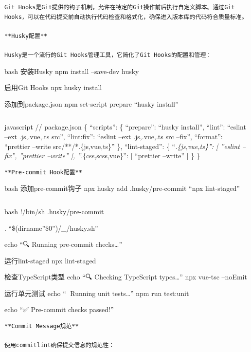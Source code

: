 {{\begin{lstlisting}
Git Hooks是Git提供的钩子机制，允许在特定的Git操作前后执行自定义脚本。通过Git Hooks，可以在代码提交前自动执行代码检查和格式化，确保进入版本库的代码符合质量标准。

**Husky配置**

Husky是一个流行的Git Hooks管理工具，它简化了Git Hooks的配置和管理：
\end{lstlisting}

bash  安装Husky npm install --save-dev husky

 启用Git Hooks npx husky install

 添加到package.json npm set-script prepare ``husky install''

\begin{lstlisting}

\end{lstlisting}

javascript // package.json \{ ``scripts'': \{ ``prepare'': ``husky install'', ``lint'': ``eslint --ext .js,.vue,.ts src'', ``lint:fix'': ``eslint --ext .js,.vue,.ts src --fix'', ``format'': ``prettier --write src/**/*.\{js,vue,ts\}'' \}, ``lint-staged'': \{ ``\emph{.\{js,vue,ts\}'': {[} ''eslint --fix'', ''prettier --write'' {]}, ''}.\{css,scss,vue\}'': {[} ``prettier --write'' {]} \} \}

\begin{lstlisting}
**Pre-commit Hook配置**
\end{lstlisting}

bash  添加pre-commit钩子 npx husky add .husky/pre-commit ``npx lint-staged''

\begin{lstlisting}

\end{lstlisting}

bash !/bin/sh  .husky/pre-commit

. ``\$(dirname''\$0'')/\_/husky.sh''

echo ``🔍 Running pre-commit checks\ldots{}''

 运行lint-staged npx lint-staged

 检查TypeScript类型 echo ``🔍 Checking TypeScript types\ldots{}'' npx vue-tsc --noEmit

 运行单元测试 echo ``🧪 Running unit tests\ldots{}'' npm run test:unit

echo ``✅ Pre-commit checks passed!''

\begin{lstlisting}
**Commit Message规范**

使用commitlint确保提交信息的规范性：
\end{lstlisting}

}}
